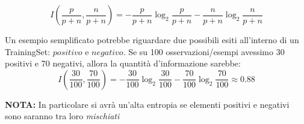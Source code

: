       \begin{equation}
\label{Contenuto informatico di un insieme}
  I\left(\frac{p}{p+n},\frac{n}{p+n}\right)=-\frac{p}{p+n}\log_2\frac{p}{p+n}
    -\frac{n}{p+n}\log_2\frac{n}{p+n}
    \end{equation}
      
  \begin{esempio}
    Un esempio semplificato potrebbe riguardare due possibili esiti all'interno di un TrainingSet: $positivo$ e $negativo$. Se su 100 osservazioni/esempi avessimo 30 positivi e 70 negativi, allora la quantità d'informazione sarebbe:
          \begin{equation*}
  I\left(\frac{30}{100},\frac{70}{100}\right)=-\frac{30}{100}\log_2\frac{30}{100}
    -\frac{70}{100}\log_2\frac{70}{100} \approx 0.88
    \end{equation*}
  \end{esempio}

\textbf{NOTA:}
  In particolare si avrà un'alta entropia se elementi positivi e negativi sono saranno tra loro \textit{mischiati}\\
  
